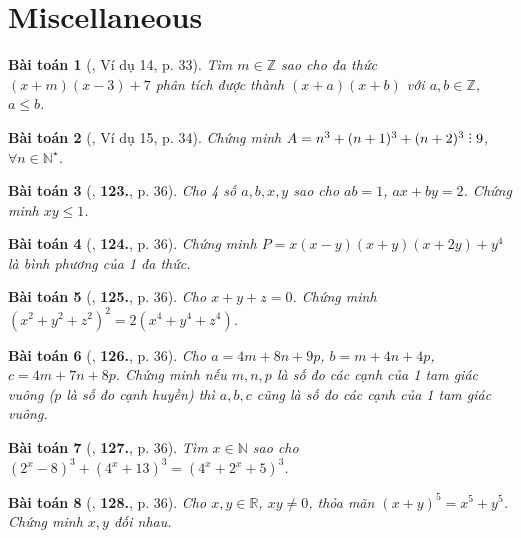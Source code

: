\documentclass{article}
\numberwithin{equation}{section}
\newtheorem{baitoan}{Bài toán}
\DeclareRobustCommand{\divby}{%
	\mathrel{\vbox{\baselineskip.65ex\lineskiplimit0pt\hbox{.}\hbox{.}\hbox{.}}}%
}
\begin{document}
\section{Miscellaneous}

\begin{baitoan}[\cite{Tuyen_Toan_8}, Ví dụ 14, p. 33]
	Tìm $m\in\mathbb{Z}$ sao cho đa thức $(x + m)(x - 3) + 7$ phân tích được thành $(x + a)(x + b)$ với $a,b\in\mathbb{Z}$, $a\le b$.
\end{baitoan}

\begin{baitoan}[\cite{Tuyen_Toan_8}, Ví dụ 15, p. 34]
	Chứng minh $A = n^3 + (n + 1)^3 + (n + 2)^3\divby9$, $\forall n\in\mathbb{N}^\star$.
\end{baitoan}

\begin{baitoan}[\cite{Tuyen_Toan_8}, \textbf{123.}, p. 36]
	Cho 4 số $a,b,x,y$ sao cho $ab = 1$, $ax + by = 2$. Chứng minh $xy\le 1$.
\end{baitoan}

\begin{baitoan}[\cite{Tuyen_Toan_8}, \textbf{124.}, p. 36]
	Chứng minh $P = x(x - y)(x + y)(x + 2y) + y^4$ là bình phương của 1 đa thức.
\end{baitoan}

\begin{baitoan}[\cite{Tuyen_Toan_8}, \textbf{125.}, p. 36]
	Cho $x + y + z = 0$. Chứng minh $(x^2 + y^2 + z^2)^2 = 2(x^4 + y^4 + z^4)$.
\end{baitoan}

\begin{baitoan}[\cite{Tuyen_Toan_8}, \textbf{126.}, p. 36]
	Cho $a = 4m + 8n + 9p$, $b = m + 4n + 4p$, $c = 4m + 7n + 8p$. Chứng minh nếu $m,n,p$ là số đo các cạnh của 1 tam giác vuông ($p$ là số đo cạnh huyền) thì $a,b,c$ cũng là số đo các cạnh của 1 tam giác vuông.
\end{baitoan}

\begin{baitoan}[\cite{Tuyen_Toan_8}, \textbf{127.}, p. 36]
	Tìm $x\in\mathbb{N}$ sao cho $(2^x - 8)^3 + (4^x + 13)^3 = (4^x + 2^x + 5)^3$.
\end{baitoan}

\begin{baitoan}[\cite{Tuyen_Toan_8}, \textbf{128.}, p. 36]
	Cho $x,y\in\mathbb{R}$, $xy\ne 0$, thỏa mãn $(x + y)^5 = x^5 + y^5$. Chứng minh $x,y$ đối nhau.
\end{baitoan}
\end{document}
